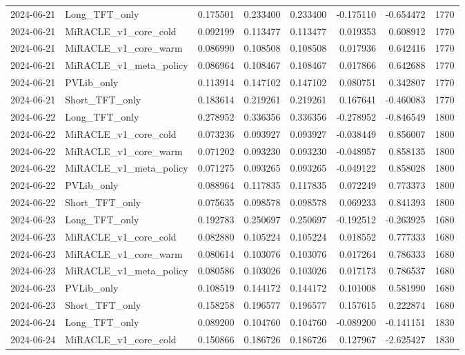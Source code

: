 \begin{tabular}{llrrrrrr}
2024-06-21 & Long_TFT_only & 0.175501 & 0.233400 & 0.233400 & -0.175110 & -0.654472 & 1770 \\
2024-06-21 & MiRACLE_v1_core_cold & 0.092199 & 0.113477 & 0.113477 & 0.019353 & 0.608912 & 1770 \\
2024-06-21 & MiRACLE_v1_core_warm & 0.086990 & 0.108508 & 0.108508 & 0.017936 & 0.642416 & 1770 \\
2024-06-21 & MiRACLE_v1_meta_policy & 0.086964 & 0.108467 & 0.108467 & 0.017866 & 0.642688 & 1770 \\
2024-06-21 & PVLib_only & 0.113914 & 0.147102 & 0.147102 & 0.080751 & 0.342807 & 1770 \\
2024-06-21 & Short_TFT_only & 0.183614 & 0.219261 & 0.219261 & 0.167641 & -0.460083 & 1770 \\
2024-06-22 & Long_TFT_only & 0.278952 & 0.336356 & 0.336356 & -0.278952 & -0.846549 & 1800 \\
2024-06-22 & MiRACLE_v1_core_cold & 0.073236 & 0.093927 & 0.093927 & -0.038449 & 0.856007 & 1800 \\
2024-06-22 & MiRACLE_v1_core_warm & 0.071202 & 0.093230 & 0.093230 & -0.048957 & 0.858135 & 1800 \\
2024-06-22 & MiRACLE_v1_meta_policy & 0.071275 & 0.093265 & 0.093265 & -0.049122 & 0.858028 & 1800 \\
2024-06-22 & PVLib_only & 0.088964 & 0.117835 & 0.117835 & 0.072249 & 0.773373 & 1800 \\
2024-06-22 & Short_TFT_only & 0.075635 & 0.098578 & 0.098578 & 0.069233 & 0.841393 & 1800 \\
2024-06-23 & Long_TFT_only & 0.192783 & 0.250697 & 0.250697 & -0.192512 & -0.263925 & 1680 \\
2024-06-23 & MiRACLE_v1_core_cold & 0.082880 & 0.105224 & 0.105224 & 0.018552 & 0.777333 & 1680 \\
2024-06-23 & MiRACLE_v1_core_warm & 0.080614 & 0.103076 & 0.103076 & 0.017264 & 0.786333 & 1680 \\
2024-06-23 & MiRACLE_v1_meta_policy & 0.080586 & 0.103026 & 0.103026 & 0.017173 & 0.786537 & 1680 \\
2024-06-23 & PVLib_only & 0.108519 & 0.144172 & 0.144172 & 0.101008 & 0.581990 & 1680 \\
2024-06-23 & Short_TFT_only & 0.158258 & 0.196577 & 0.196577 & 0.157615 & 0.222874 & 1680 \\
2024-06-24 & Long_TFT_only & 0.089200 & 0.104760 & 0.104760 & -0.089200 & -0.141151 & 1830 \\
2024-06-24 & MiRACLE_v1_core_cold & 0.150866 & 0.186726 & 0.186726 & 0.127967 & -2.625427 & 1830 \\

\end{tabular}
